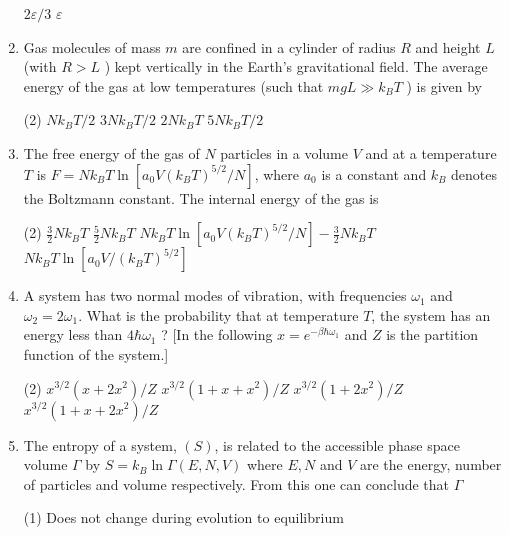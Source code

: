 \begin{enumerate}
\begin{tasks}
	\task[\textbf{c.}]$2 \varepsilon / 3$
	\task[\textbf{d.}]  $\varepsilon$
\end{tasks}	
\item 	Gas molecules of mass $m$ are confined in a cylinder of radius $R$ and height $L$ (with $R>L$ ) kept vertically in the Earth's gravitational field. The average energy of the gas at low temperatures (such that $m g L \gg k_{B} T$ ) is given by
{	}
	 \begin{tasks}(2)
		\task[\textbf{a.}]$N k_{B} T / 2$
		\task[\textbf{b.}]$3 N k_{B} T / 2$
		\task[\textbf{c.}]$2 N k_{B} T$
		\task[\textbf{d.}] $5 N k_{B} T / 2$
	\end{tasks}
\item 	The free energy of the gas of $N$ particles in a volume $V$ and at a temperature $T$ is $F=N k_{B} T \ln \left[a_{0} V\left(k_{B} T\right)^{5 / 2} / N\right]$, where $a_{0}$ is a constant and $k_{B}$ denotes the Boltzmann constant. The internal energy of the gas is
{	}
 \begin{tasks}(2)
	\task[\textbf{a.}]$\frac{3}{2} N k_{B} T$
	\task[\textbf{b.}]$\frac{5}{2} N k_{B} T$
	\task[\textbf{c.}]$N k_{B} T \ln \left[a_{0} V\left(k_{B} T\right)^{5 / 2} / N\right]-\frac{3}{2} N k_{B} T$
	\task[\textbf{d.}]  $N k_{B} T \ln \left[a_{0} V /\left(k_{B} T\right)^{5 / 2}\right]$
\end{tasks}	
	\item A system has two normal modes of vibration, with frequencies $\omega_{1}$ and $\omega_{2}=2 \omega_{1}$. What is the probability that at temperature $T$, the system has an energy less than $4 \hbar \omega_{1}$ ?
	[In the following $x=e^{-\beta \hbar \omega_{1}}$ and $Z$ is the partition function of the system.]
	{	}
	 \begin{tasks}(2)
		\task[\textbf{a.}]$x^{3 / 2}\left(x+2 x^{2}\right) / Z$
		\task[\textbf{b.}]$x^{3 / 2}\left(1+x+x^{2}\right) / Z$
		\task[\textbf{c.}]$x^{3 / 2}\left(1+2 x^{2}\right) / Z$
		\task[\textbf{d.}] $x^{3 / 2}\left(1+x+2 x^{2}\right) / Z$
	\end{tasks}
\item 	The entropy of a system, $(S)$, is related to the accessible phase space volume $\Gamma$ by $S=k_{B} \ln \Gamma(E, N, V)$ where $E, N$ and $V$ are the energy, number of particles and volume respectively. From this one can conclude that $\Gamma$
{	}
	 \begin{tasks}(1)
		\task[\textbf{a.}]Does not change during evolution to equilibrium

\end{tasks}
\end{enumerate}
